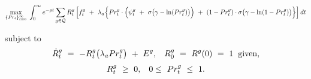 \begin{footnotesize}
\begin{equation}
\begin{split}
    \underset{\{Pr_{t}\}_{t = 0}^{\infty}}{\max} \hspace{0.1cm} \int_{0}^{\infty} e^{-\rho t} \sum_{g \in \mathcal{Q}} R_{t}^{g} \left[ f_{t}^{g} \ + \ \lambda_{a} \Big\{ Pr_{t}^{g} \cdot \Big( \psi_{t}^{g} \ + \ \sigma \big( \gamma - \ln(Pr_{t}^{g}) \big) \Big) \ + \ (1 - Pr_{t}^{g}) \cdot \sigma \big( \gamma - \ln(1 - Pr_{t}^{g}) \big) \Big\} \right] dt
\end{split}
\label{Equation:Firms-Problem_Expected-Payoff-Maximization-Problem}
\end{equation}
\end{footnotesize}
subject to
\begin{equation}
\begin{split}
    \dot{R}_{t}^{g} \ = \ -R_{t}^{g} \big( \lambda_{a} Pr_{t}^{g} \big) \ + \ E^{g}, \hspace{0.3cm} R_{0}^{g} \ = \ R^{g}(0) \ = \ 1 \hspace{0.2cm} \text{given,}
\end{split}
\end{equation}
\begin{equation}
\begin{split}
    R_{t}^{g} \ \geq \ 0, \hspace{0.3cm} 0 \leq \ Pr_{t}^{g} \ \leq \ 1.
\end{split}
\end{equation}